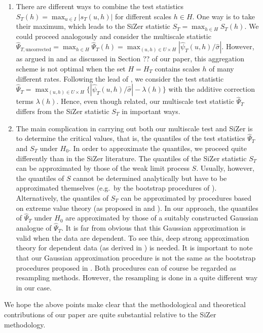 \documentclass[a4paper,12pt]{article}
\begin{document}
\begin{enumerate}[label=(\roman*), leftmargin=0.8cm]
\item There are different ways to combine the test statistics $S_T(h) = \max_{u \in I} |s_T(u,h)|$ for different scales $h \in H$. One way is to take their maximum, which leads to the SiZer statistic $S_T = \max_{h \in H} S_T(h)$. We could proceed analogously and consider the multiscale statistic $\widehat{\Psi}_{T,\text{uncorrected}} = \max_{h \in H} \widehat{\Psi}_T(h) = \max_{(u,h) \in U \times H} |\widehat{\psi}_T(u,h)/\widehat{\sigma}|$. However, as argued in \cite{DuembgenSpokoiny2001} and as discussed in Section ?? of our paper, this aggregation scheme is not optimal when the set $H = H_T$ contains scales $h$ of many different rates. Following the lead of \cite{DuembgenSpokoiny2001}, we consider the test statistic $\widehat{\Psi}_T = \max_{(u,h) \in U \times H} \{ |\widehat{\psi}_T(u,h)/\widehat{\sigma}| - \lambda(h) \}$ with the additive correction terms $\lambda(h)$. Hence, even though related, our multiscale test statistic $\widehat{\Psi}_T$ differs from the SiZer statistic $S_T$ in important ways. 

\item The main complication in carrying out both our multiscale test and SiZer is to determine the critical values, that is, the quantiles of the test statistics $\widehat{\Psi}_T$ and $S_T$ under $H_0$. In order to approximate the quantiles, we proceed quite differently than in the SiZer literature. The quantiles of the SiZer statistic $S_T$ can be approximated by those of the weak limit process $S$. Usually, however, the quantiles of $S$ cannot be determined analytically but have to be approximated themselves (e.g.\ by the bootstrap procedures of \cite{ChaudhuriMarron1999, ChaudhuriMarron2000}). Alternatively, the quantiles of $S_T$ can be approximated by procedures based on extreme value theory (as proposed in \cite{HannigMarron2006} and \cite{ParkHannigKang2009}). In our approach, the quantiles of $\widehat{\Psi}_T$ under $H_0$ are approximated by those of a suitably constructed Gaussian analogue of $\widehat{\Psi}_T$. It is far from obvious that this Gaussian approximation is valid when the data are dependent. To see this, deep strong approximation theory for dependent data (as derived in \cite{BerkesLiuWu2014}) is needed. It is important to note that our Gaussian approximation procedure is not the same as the bootstrap procedures proposed in \cite{ChaudhuriMarron1999, ChaudhuriMarron2000}. Both procedures can of course be regarded as resampling methods. However, the resampling is done in a quite different way in our case.

\end{enumerate}
We hope the above points make clear that the methodological and theoretical contributions of our paper are quite substantial relative to the SiZer methodology. 
\end{document}
